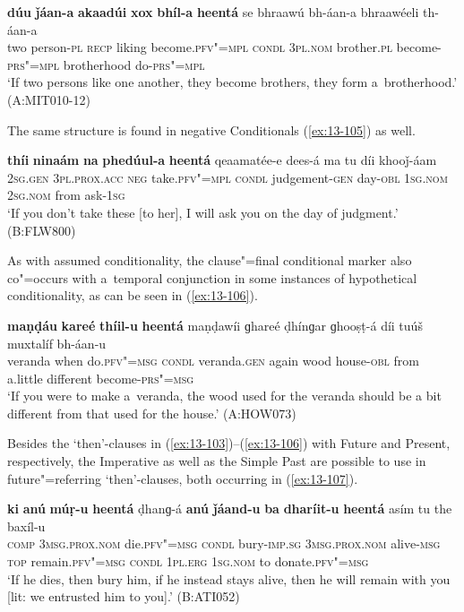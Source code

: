 \ex
\label{ex:13-104}
\gll \textbf{dúu} \textbf{ǰáan-a} \textbf{akaadúi} \textbf{xox} \textbf{bhíl-a} \textbf{heentá} se bhraawú bh-áan-a bhraawéeli th-áan-a\\
two person-\textsc{pl} \textsc{recp} liking become.\textsc{pfv"=mpl} \textsc{condl} \textsc{3pl.nom} brother.\textsc{pl} become-\textsc{prs"=mpl} brotherhood do-\textsc{prs"=mpl} \\
\glt `If two persons like one another, they become brothers, they form a~brotherhood.' (A:MIT010-12) 
\z

The same structure is found in negative Conditionals (\ref{ex:13-105}) as well.

\begin{exe}
\ex
\label{ex:13-105}
\gll \textbf{thíi} \textbf{ninaám} \textbf{na} \textbf{phedúul-a} \textbf{heentá}  qeaamatée-e dees-á ma tu díi khooǰ-áam \\
\textsc{2sg.gen} \textsc{3pl.prox.acc} \textsc{neg} take.\textsc{pfv"=mpl} \textsc{condl} judgement-\textsc{gen} day-\textsc{obl} \textsc{1sg.nom} \textsc{2sg.nom} from ask-\textsc{1sg}  \\
\glt `If you don't take these [to her], I will ask you on the day of judgment.' (B:FLW800) 
\end{exe}

As with assumed conditionality, the clause"=final conditional marker also co"=occurs with a~temporal conjunction in some instances of hypothetical conditionality, as can be seen in (\ref{ex:13-106}). 

\begin{exe}
\ex
\label{ex:13-106}
\gll \textbf{maṇḍáu} \textbf{kareé} \textbf{thíil-u} \textbf{heentá} maṇḍawíi ɡhareé ḍhínɡar ɡhooṣṭ-á díi tuúš muxtalíf bh-áan-u  \\
veranda when do.\textsc{pfv"=msg} \textsc{condl} veranda.\textsc{gen} again wood house-\textsc{obl} from a.little different become-\textsc{prs"=msg} \\
\glt `If you were to make a~veranda, the wood used for the veranda should be a bit different from that used for the house.' (A:HOW073) 
\end{exe}

Besides the `then'-clauses in (\ref{ex:13-103})--(\ref{ex:13-106}) with Future and Present, respectively, the Imperative as well as the Simple Past are possible to use in future"=referring `then'-clauses, both occurring in (\ref{ex:13-107}).

\begin{exe}
\ex
\label{ex:13-107}
\gll \textbf{ki} \textbf{anú} \textbf{múṛ-u} \textbf{heentá} ḍhanɡ-á  \textbf{anú} \textbf{ǰáand-u} \textbf{ba} \textbf{dharíit-u} \textbf{heentá} asím tu the baxíl-u\\
\textsc{comp} \textsc{3msg.prox.nom} die.\textsc{pfv"=msg} \textsc{condl} bury-\textsc{imp.sg}  \textsc{3msg.prox.nom} alive-\textsc{msg} \textsc{top} remain.\textsc{pfv"=msg} \textsc{condl}  \textsc{1pl.erg} \textsc{1sg.nom} to donate.\textsc{pfv"=msg}\\
\glt `If he dies, then bury him, if he instead stays alive, then he will remain with you [lit: we entrusted him to you].' (B:ATI052) 
\end{exe}


